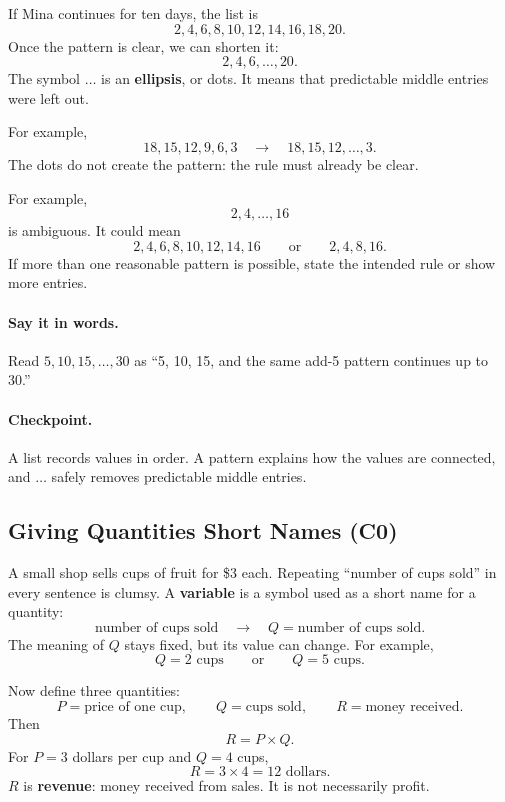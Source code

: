 	If Mina continues for ten days, the list is
	\[
	2,4,6,8,10,12,14,16,18,20.
	\]
	Once the pattern is clear, we can shorten it:
	\[
	2,4,6,\ldots,20.
	\]
	The symbol $\ldots$ is an \textbf{ellipsis}, or dots. It means that predictable middle entries were left out.
	
	For example,
	\[
	18,15,12,9,6,3
	\quad\longrightarrow\quad
	18,15,12,\ldots,3.
	\]
	The dots do not create the pattern: the rule must already be clear.
	
	For example,
	\[
	2,4,\ldots,16
	\]
	is ambiguous. It could mean
	\[
	2,4,6,8,10,12,14,16
	\qquad\text{or}\qquad
	2,4,8,16.
	\]
	If more than one reasonable pattern is possible, state the intended rule or show more entries.
	
	\paragraph{Say it in words.}
	Read $5,10,15,\ldots,30$ as
	``5, 10, 15, and the same add-5 pattern continues up to 30.''
	
	\paragraph{Checkpoint.}
	A list records values in order. A pattern explains how the values are connected, and $\ldots$ safely removes predictable middle entries.
	
	
	\subsection{Giving Quantities Short Names (C0)}
	\label{sec:variables-c0}
	
	A small shop sells cups of fruit for \$3 each. Repeating ``number of cups sold'' in every sentence is clumsy. A \textbf{variable} is a symbol used as a short name for a quantity:
	\[
	\text{number of cups sold}
	\quad\longrightarrow\quad
	Q=\text{number of cups sold}.
	\]
	The meaning of $Q$ stays fixed, but its value can change. For example,
	\[
	Q=2 \text{ cups}
	\qquad\text{or}\qquad
	Q=5 \text{ cups}.
	\]
	
	Now define three quantities:
	\[
	P=\text{price of one cup},\qquad
	Q=\text{cups sold},\qquad
	R=\text{money received}.
	\]
	Then
	\[
	R=P\times Q.
	\]
	For $P=3$ dollars per cup and $Q=4$ cups,
	\[
	R=3\times4=12\text{ dollars}.
	\]
	$R$ is \textbf{revenue}: money received from sales. It is not necessarily profit.
	
